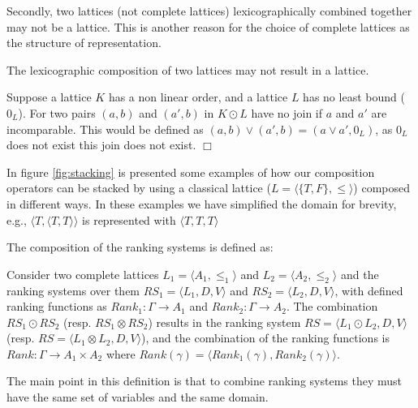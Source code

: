 Secondly, two lattices (not complete lattices) lexicographically combined together may not be a lattice. 
This is another reason for the choice of complete lattices as the structure of representation.
\begin{prop}
The lexicographic composition of two lattices may not result in a lattice.
\end{prop}
\begin{prof}
Suppose a lattice $K$ has a non linear order, and a lattice $L$ has no least bound ($0_L$). 
For two pairs $(a,b)$ and $(a',b)$ in $K \odot L$ have no join if $a$ and $a'$ are incomparable.
This would be defined as $(a,b) \vee (a',b) = (a \vee a',0_L)$, as $0_L$ does not exist this join does not exist.
$\Box$\end{prof}

In figure \ref{fig:stacking} is presented some examples of how our composition operators can be stacked
by using a classical lattice ($L = \langle \{T,F\}, \leq \rangle$) composed in different ways.
In these examples we have simplified the domain for brevity, 
e.g., $\langle T, \langle T,T\rangle\rangle$ is represented with $\langle T,T,T\rangle$

The composition of the ranking systems is defined as:
\begin{defs}
Consider two complete lattices $L_1 = \langle A_1, \leq_1 \rangle$ and $L_2 = \langle A_2,\leq_2 \rangle$ and
the ranking systems over them $RS_1 = \langle L_1,D,V \rangle $ and $RS_2 = \langle L_2,D,V \rangle$,
with defined ranking functions as $Rank_1: \Gamma \rightarrow A_1 $ and $Rank_2: \Gamma \rightarrow A_2$.
The combination $RS_1 \odot RS_2$ (resp. $RS_1 \otimes RS_2$) results in the ranking system 
$RS = \langle L_1 \odot L_2, D, V \rangle$ (resp. $RS = \langle L_1 \otimes L_2, D, V \rangle$), 
and the combination of the ranking functions is 
$Rank: \Gamma \rightarrow A_1 \times A_2$ where $Rank(\gamma) = \langle Rank_1(\gamma), Rank_2(\gamma) \rangle$.
\end{defs}

The main point in this definition is that to combine ranking systems they must have the same set of variables 
and the same domain.

